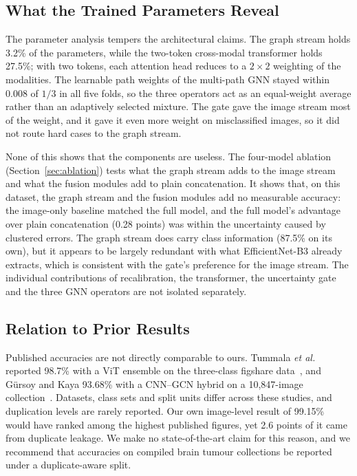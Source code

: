 \documentclass[journal,onecolumn]{IEEEtran}
\begin{document}
\subsection{What the Trained Parameters Reveal}\label{sec:params}
The parameter analysis tempers the architectural claims. The graph stream holds 3.2\% of the parameters, while the two-token cross-modal transformer holds 27.5\%; with two tokens, each attention head reduces to a $2 \times 2$ weighting of the modalities. The learnable path weights of the multi-path GNN stayed within 0.008 of $1/3$ in all five folds, so the three operators act as an equal-weight average rather than an adaptively selected mixture. The gate gave the image stream most of the weight, and it gave it even more weight on misclassified images, so it did not route hard cases to the graph stream.

None of this shows that the components are useless. The four-model ablation (Section~\ref{sec:ablation}) tests what the graph stream adds to the image stream and what the fusion modules add to plain concatenation. It shows that, on this dataset, the graph stream and the fusion modules add no measurable accuracy: the image-only baseline matched the full model, and the full model's advantage over plain concatenation (0.28 points) was within the uncertainty caused by clustered errors. The graph stream does carry class information (87.5\% on its own), but it appears to be largely redundant with what EfficientNet-B3 already extracts, which is consistent with the gate's preference for the image stream. The individual contributions of recalibration, the transformer, the uncertainty gate and the three GNN operators are not isolated separately.

\subsection{Relation to Prior Results}
Published accuracies are not directly comparable to ours. Tummala \textit{et al.} reported 98.7\% with a ViT ensemble on the three-class figshare data~\cite{tummala2022classification}, and G\"{u}rsoy and Kaya 93.68\% with a CNN--GCN hybrid on a 10,847-image collection~\cite{gursoy2024braingcn}. Datasets, class sets and split units differ across these studies, and duplication levels are rarely reported. Our own image-level result of 99.15\% would have ranked among the highest published figures, yet 2.6 points of it came from duplicate leakage. We make no state-of-the-art claim for this reason, and we recommend that accuracies on compiled brain tumour collections be reported under a duplicate-aware split.
\end{document}
